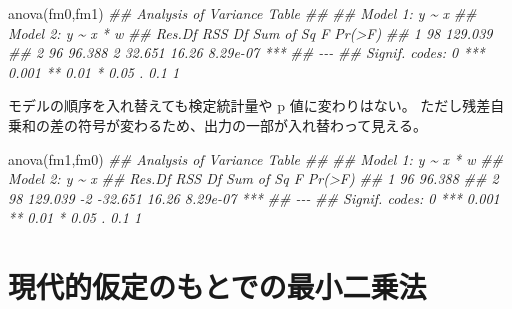\documentclass[
  letterpaper,
  xelatex,
  ja=standard, xelatex]{bxjsbook}
\newenvironment{Shaded}{\begin{snugshade}}{\end{snugshade}}
\newcommand{\DocumentationTok}[1]{\textcolor[rgb]{0.37,0.37,0.37}{\textit{#1}}}
\newcommand{\FunctionTok}[1]{\textcolor[rgb]{0.28,0.35,0.67}{#1}}
\newcommand{\NormalTok}[1]{\textcolor[rgb]{0.00,0.23,0.31}{#1}}
\begin{document}
\begin{Shaded}
\begin{Highlighting}[]
\FunctionTok{anova}\NormalTok{(fm0,fm1)}
\DocumentationTok{\#\# Analysis of Variance Table}
\DocumentationTok{\#\# }
\DocumentationTok{\#\# Model 1: y \textasciitilde{} x}
\DocumentationTok{\#\# Model 2: y \textasciitilde{} x * w}
\DocumentationTok{\#\#   Res.Df     RSS Df Sum of Sq     F   Pr(\textgreater{}F)    }
\DocumentationTok{\#\# 1     98 129.039                                }
\DocumentationTok{\#\# 2     96  96.388  2    32.651 16.26 8.29e{-}07 ***}
\DocumentationTok{\#\# {-}{-}{-}}
\DocumentationTok{\#\# Signif. codes:  0 \textquotesingle{}***\textquotesingle{} 0.001 \textquotesingle{}**\textquotesingle{} 0.01 \textquotesingle{}*\textquotesingle{} 0.05 \textquotesingle{}.\textquotesingle{} 0.1 \textquotesingle{} \textquotesingle{} 1}
\end{Highlighting}
\end{Shaded}

モデルの順序を入れ替えても検定統計量や p 値に変わりはない。
ただし残差自乗和の差の符号が変わるため、出力の一部が入れ替わって見える。

\begin{Shaded}
\begin{Highlighting}[]
\FunctionTok{anova}\NormalTok{(fm1,fm0)}
\DocumentationTok{\#\# Analysis of Variance Table}
\DocumentationTok{\#\# }
\DocumentationTok{\#\# Model 1: y \textasciitilde{} x * w}
\DocumentationTok{\#\# Model 2: y \textasciitilde{} x}
\DocumentationTok{\#\#   Res.Df     RSS Df Sum of Sq     F   Pr(\textgreater{}F)    }
\DocumentationTok{\#\# 1     96  96.388                                }
\DocumentationTok{\#\# 2     98 129.039 {-}2   {-}32.651 16.26 8.29e{-}07 ***}
\DocumentationTok{\#\# {-}{-}{-}}
\DocumentationTok{\#\# Signif. codes:  0 \textquotesingle{}***\textquotesingle{} 0.001 \textquotesingle{}**\textquotesingle{} 0.01 \textquotesingle{}*\textquotesingle{} 0.05 \textquotesingle{}.\textquotesingle{} 0.1 \textquotesingle{} \textquotesingle{} 1}
\end{Highlighting}
\end{Shaded}


\chapter{現代的仮定のもとでの最小二乗法}\label{ux73feux4ee3ux7684ux4eeeux5b9aux306eux3082ux3068ux3067ux306eux6700ux5c0fux4e8cux4e57ux6cd5}
\end{document}
